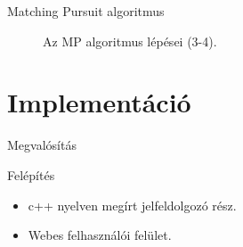 \documentclass{beamer}
\begin{document}
\begin{frame}{Matching Pursuit algoritmus}
{\begin{figure}[htb!]
\caption{Az MP algoritmus lépései (3-4).}
\end{figure}
}
\end{frame}

\section{Implementáció}
\label{tab:implemenation}
\begin{frame}{Megvalósítás}
\linespread{0.8}
\small
\vspace{-2mm}
\begin{block}{Felépítés}
	\begin{itemize}
		\item c++ nyelven megírt jelfeldolgozó rész.
		\item Webes felhasználói felület.
	\end{itemize}
	\end{block}
			
\end{frame}
\end{document}
